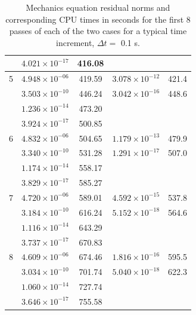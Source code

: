 \begin{table}
\begin{tabular}{|r|c|c|c|c|}
      & $ 4.021\times 10^{-17}$ &  416.08   & $                    $   &  \\
\hline                                    
5     & $ 4.948\times 10^{-06}$ &  419.59   & $3.078 \times 10^{-12}$  &  421.4 \\
      & $ 3.503\times 10^{-10}$ &  446.24   & $3.042 \times 10^{-16}$  &  448.6 \\
      & $ 1.236\times 10^{-14}$ &  473.20   & $                    $   &  \\
      & $ 3.924\times 10^{-17}$ &  500.85   & $                    $   &  \\
\hline                                    
6     & $ 4.832\times 10^{-06}$ &  504.65   & $1.179 \times 10^{-13}$  &  479.9 \\
      & $ 3.340\times 10^{-10}$ &  531.28   & $1.291 \times 10^{-17}$  &  507.0 \\
      & $ 1.174\times 10^{-14}$ &  558.17   & $                    $   &  \\
      & $ 3.829\times 10^{-17}$ &  585.27   & $                    $   &  \\
\hline                                    
7     & $ 4.720\times 10^{-06}$ &  589.01   & $4.592 \times 10^{-15}$  &  537.8 \\
      & $ 3.184\times 10^{-10}$ &  616.24   & $5.152 \times 10^{-18}$  &  564.6 \\
      & $ 1.116\times 10^{-14}$ &  643.29   & $                    $   &  \\
      & $ 3.737\times 10^{-17}$ &  670.83   & $                    $   &  \\
\hline                                    
8     & $ 4.609\times 10^{-06}$ &  674.46   & $1.816 \times 10^{-16}$  &  595.5  \\
      & $ 3.034\times 10^{-10}$ &  701.74   & $5.040 \times 10^{-18}$  &  622.3  \\
      & $ 1.060\times 10^{-14}$ &  727.74   & $                    $   &  \\
      & $ 3.646\times 10^{-17}$ &  755.58   & $                    $   &  \\
\hline
\end{tabular}
\caption{Mechanics equation residual norms and corresponding CPU times
  in seconds for the first 8 passes of each of the two cases for a
  typical time increment, $\Delta t=$ 0.1 s.}
\label{resnorms}
\end{table}


